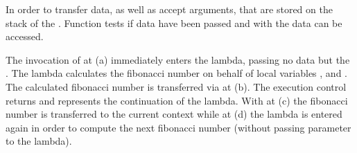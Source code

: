 In order to transfer data, \call as well as \resume accept arguments, that are
stored on the stack of the \currcont. Function \davail tests if data have been
passed and with \dtransfer the data can be accessed.

The invocation of \call at (a) immediately enters the lambda, passing no data
but the \currcont. The lambda calculates the fibonacci number on behalf of local
variables ,  and . The calculated fibonacci number is
transferred via \resume at (b). The execution control returns and 
represents the continuation of the lambda. With \dtransfer at (c) the fibonacci
number is transferred to the current context while at (d) the lambda is entered
again in order to compute the next fibonacci number (without passing parameter
to the lambda).

